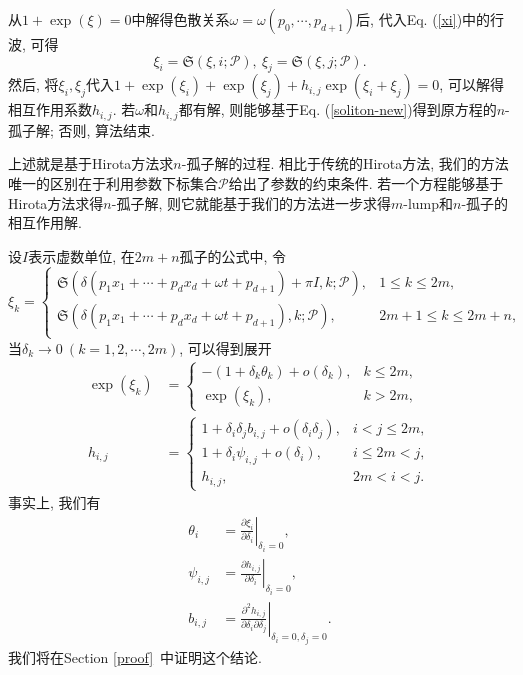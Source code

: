 \documentclass[12pt,a4paper,UTF8]{article}
\newcommand{\sbrace}[1]{\left(#1\right)}
\newcommand{\eval}[2]{\left.{#1}\right|_{#2}}
\newcommand{\PS}{\mathcal{P}}
\newcommand{\DIFF}[2]{\ensuremath{\frac{\partial #1}{\partial #2}}}
\newcommand{\SP}{\mathfrak{S}} %
\newcommand{\refeqn}[1]{Eq. (\ref{#1})}
\newcommand{\refsec}[1]{Section \ref{#1}~}
\newcommand{\MLNS}{$m$-lump和$n$-孤子的相互作用解}
\begin{document}
从$1+\exp(\xi)=0$中解得色散关系$\omega=\omega(p_0,\cdots,p_{d+1})$后, 代入\refeqn{xi}中的行波, 可得
\begin{equation}
  \xi_i=\SP\sbrace{\xi,i;\PS} , ~ \xi_j=\SP\sbrace{\xi,j;\PS} .
\end{equation}
然后, 将$\xi_i,\xi_j$代入$1+\exp(\xi_i)+\exp(\xi_j)+h_{i,j}\exp(\xi_i+\xi_j)=0$, 可以解得相互作用系数$h_{i,j}$. 若$\omega$和$h_{i,j}$都有解, 则能够基于\refeqn{soliton-new}得到原方程的$n$-孤子解; 否则, 算法结束. 

上述就是基于Hirota方法求$n$-孤子解的过程. 相比于传统的Hirota方法, 我们的方法唯一的区别在于利用参数下标集合$\PS$给出了参数的约束条件. 若一个方程能够基于Hirota方法求得$n$-孤子解, 则它就能基于我们的方法进一步求得\MLNS{}. 

设$I$表示虚数单位, 在$2m+n$孤子的公式中, 令
\begin{equation}
\xi_k=\left\{\begin{array}{ll}
  \SP\sbrace{\delta\sbrace{p_1 x_1+\cdots+p_d x_d+\omega t+p_{d+1}} +\pi I,k;\PS} ,&  1\le k\le 2m,\\
  \SP\sbrace{\delta\sbrace{p_1 x_1+\cdots+p_d x_d+\omega t+p_{d+1}},k;\PS} ,&  2m+1\le k \le 2m+n, \\
\end{array}\right. 
\end{equation}
当$\delta_k\to 0~(k=1,2,\cdots,2m)$, 可以得到展开
\begin{equation}
\begin{aligned}
  \exp\sbrace{\xi_k}&=\left\{\begin{array}{ll}
    -\sbrace{1+\delta_k \theta_k}+o\sbrace{\delta_k}, & k\le 2m, \\ 
    \exp\sbrace{\xi_k}, & k>2m,   
    \end{array}\right. \\ 
  h_{i,j}&=\left\{\begin{array}{ll}
    1+\delta_i \delta_j b_{i,j}+o\sbrace{\delta_i \delta_j}, & i<j\le 2m, \\
    1+\delta_i \psi_{i,j}+o\sbrace{\delta_i}, & i\le 2m < j , \\
    h_{i,j}, & 2m<i<j.
    \end{array}\right.
\end{aligned}
\label{expand}
\end{equation}
事实上, 我们有 
\begin{equation}
\begin{aligned} 
\theta_i &= \eval{\DIFF{\xi_i}{\delta_i}}{\delta_i=0},\\ 
\psi_{i,j} &= \eval{\DIFF{h_{i,j}}{\delta_i}}{\delta_i=0} ,\\ 
b_{i,j} &= \eval{\frac{\partial^2 h_{i,j}}{\partial \delta_i \partial \delta_j}}{\delta_i=0,\delta_j=0} .
\end{aligned}
\label{params}
\end{equation}
我们将在\refsec{proof}中证明这个结论. 
\end{document}
